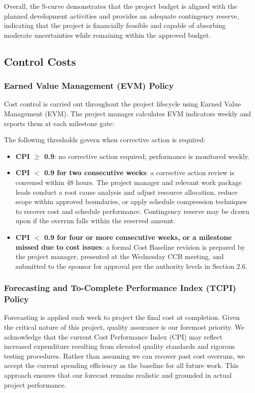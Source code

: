 \documentclass[12pt,a4paper]{article}
\begin{document}
Overall, the S-curve demonstrates that the project budget is aligned with the planned development activities and provides an adequate contingency reserve, indicating that the project is financially feasible and capable of absorbing moderate uncertainties while remaining within the approved budget.


\subsection{Control Costs}


\subsubsection{Earned Value Management (EVM) Policy}
Cost control is carried out throughout the project lifecycle using Earned Value Management (EVM). The project manager calculates EVM indicators weekly and reports them at each milestone gate:


The following thresholds govern when corrective action is required:

\begin{itemize}[leftmargin=*]
    \item \textbf{CPI $\geq$ 0.9}: no corrective action required; performance is monitored weekly.
    \item \textbf{CPI $<$ 0.9 for two consecutive weeks}: a corrective action review is convened within 48 hours. The project manager and relevant work package leads conduct a root cause analysis and adjust resource allocation, reduce scope within approved boundaries, or apply schedule compression techniques to recover cost and schedule performance. Contingency reserve may be drawn upon if the overrun falls within the reserved amount.
    \item \textbf{CPI $<$ 0.9 for four or more consecutive weeks, or a milestone missed due to cost issues}: a formal Cost Baseline revision is prepared by the project manager, presented at the Wednesday CCB meeting, and submitted to the sponsor for approval per the authority levels in Section 2.6.
\end{itemize}
\subsubsection{Forecasting and To-Complete Performance Index (TCPI) Policy}
Forecasting is applied each week to project the final cost at completion. Given the critical nature of this project, quality assurance is our foremost priority. We acknowledge that the current Cost Performance Index (CPI) may reflect increased expenditure resulting from elevated quality standards and rigorous testing procedures. Rather than assuming we can recover past cost overruns, we accept the current spending efficiency as the baseline for all future work. This approach ensures that our forecast remains realistic and grounded in actual project performance.
\end{document}
